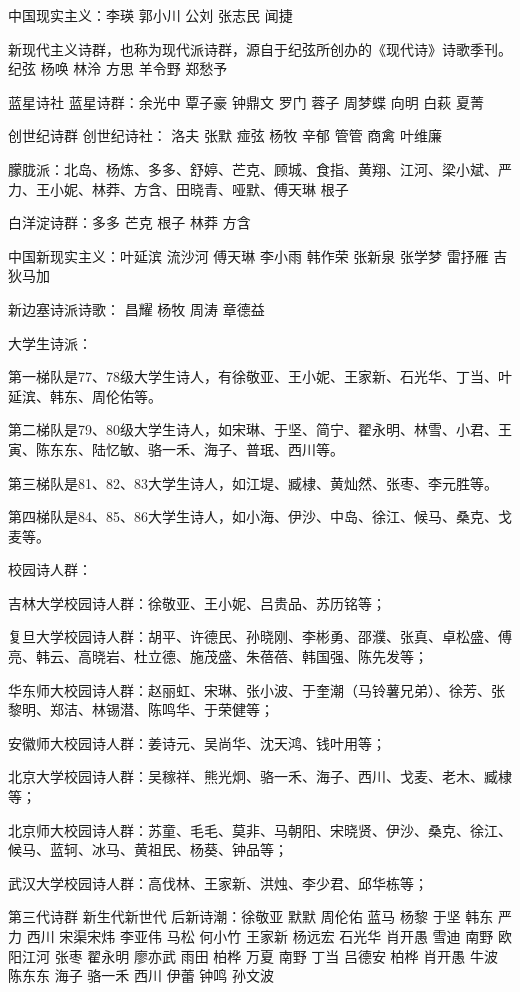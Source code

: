 \documentclass[UTF8]{../../RepresentationUniverse}
\begin{document}
中国现实主义：李瑛 郭小川 公刘 张志民 闻捷


新现代主义诗群，也称为现代派诗群，源自于纪弦所创办的《现代诗》诗歌季刊。纪弦 杨唤 林泠 方思 羊令野 郑愁予



蓝星诗社 蓝星诗群：余光中 覃子豪 钟鼎文 罗门 蓉子 周梦蝶 向明 白萩 夏菁


创世纪诗群 创世纪诗社： 洛夫 张默 痖弦 杨牧 辛郁 管管 商禽 叶维廉




朦胧派：北岛、杨炼、多多、舒婷、芒克、顾城、食指、黄翔、江河、梁小斌、严力、王小妮、林莽、方含、田晓青、哑默、傅天琳 根子 


白洋淀诗群：多多 芒克 根子 林莽 方含


中国新现实主义：叶延滨 流沙河 傅天琳 李小雨 韩作荣 张新泉 张学梦 雷抒雁 吉狄马加


新边塞诗派诗歌： 昌耀 杨牧 周涛 章德益




大学生诗派：

第一梯队是77、78级大学生诗人，有徐敬亚、王小妮、王家新、石光华、丁当、叶延滨、韩东、周伦佑等。

第二梯队是79、80级大学生诗人，如宋琳、于坚、简宁、翟永明、林雪、小君、王寅、陈东东、陆忆敏、骆一禾、海子、普珉、西川等。

第三梯队是81、82、83大学生诗人，如江堤、臧棣、黄灿然、张枣、李元胜等。

第四梯队是84、85、86大学生诗人，如小海、伊沙、中岛、徐江、候马、桑克、戈麦等。

校园诗人群：

吉林大学校园诗人群：徐敬亚、王小妮、吕贵品、苏历铭等；

复旦大学校园诗人群：胡平、许德民、孙晓刚、李彬勇、邵濮、张真、卓松盛、傅亮、韩云、高晓岩、杜立德、施茂盛、朱蓓蓓、韩国强、陈先发等；

华东师大校园诗人群：赵丽虹、宋琳、张小波、于奎潮（马铃薯兄弟）、徐芳、张黎明、郑洁、林锡潜、陈鸣华、于荣健等；

安徽师大校园诗人群：姜诗元、吴尚华、沈天鸿、钱叶用等；

北京大学校园诗人群：吴稼祥、熊光炯、骆一禾、海子、西川、戈麦、老木、臧棣等；

北京师大校园诗人群：苏童、毛毛、莫非、马朝阳、宋晓贤、伊沙、桑克、徐江、候马、蓝轲、冰马、黄祖民、杨葵、钟品等；

武汉大学校园诗人群：高伐林、王家新、洪烛、李少君、邱华栋等；


第三代诗群 新生代新世代 后新诗潮：徐敬亚 默默 周伦佑 蓝马 杨黎 于坚 韩东 严力 西川 宋渠宋炜 李亚伟 马松 何小竹 王家新 杨远宏 石光华 肖开愚 雪迪 南野 欧阳江河 张枣 翟永明 廖亦武 雨田 柏桦 万夏 南野 丁当 吕德安 柏桦 肖开愚 牛波 陈东东 海子 骆一禾 西川 伊蕾 钟鸣 孙文波
\end{document}
